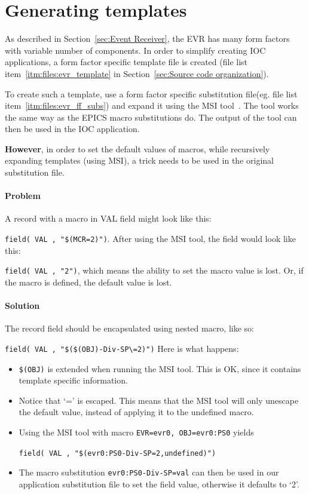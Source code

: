 \documentclass[12pt,a4paper]{article}
\let\stdsection\section
\renewcommand\section{\newpage\stdsection}
\begin{document}
\section{Generating templates}\label{sec:Generating templates}
As described in Section~\ref{sec:Event Receiver}, the EVR has many form factors with variable number of components. In order to simplify creating IOC applications, a form factor specific template file is created (file list item~\ref{itm:files:evr_template} in Section~\ref{sec:Source code organization}).

To create such a template, use a form factor specific substitution file(eg. file list item~\ref{itm:files:evr_ff_subs}) and expand it using the
MSI tool~\cite{msi}. The tool works the same way as the EPICS macro substitutions do. The output of
the tool can then be used in the IOC application.

\textbf{However}, in order to set the default values of macros, while
recursively expanding templates (using MSI), a trick needs to be used in
the original substitution file.

\paragraph{Problem}\label{problem}
A record with a macro in VAL field might look like this:

\texttt{field( VAL , "\$(MCR=2)")}. 
After using the MSI tool, the field would look like this: 

\texttt{field( VAL , "2")}, 
which means the ability to set the macro value is lost. Or, if the macro is
defined, the default value is lost.

\paragraph{Solution}\label{solution}
The record field should be encapsulated using nested macro, like so:

\texttt{field( VAL , "\$(\$(OBJ)-Div-SP\textbackslash{}=2)")} 
Here is what happens: 
\begin{itemize}
\item 
	\texttt{\$(OBJ)} is extended when running the MSI tool.
This is OK, since it contains template specific information.
\item 
	Notice that `=' is escaped. This means that the MSI tool will only unescape the
default value, instead of applying it to the undefined macro. 
\item  
	Using the MSI tool with macro \texttt{EVR=evr0, OBJ=evr0:PS0} yields
	
\texttt{field( VAL , "\$(evr0:PS0-Div-SP=2,undefined)")} 
\item 
	The macro substitution \texttt{evr0:PS0-Div-SP=val} can then be used in our application substitution file to set the field value, otherwise it defaults to `2'.
\end{itemize}
\end{document}
